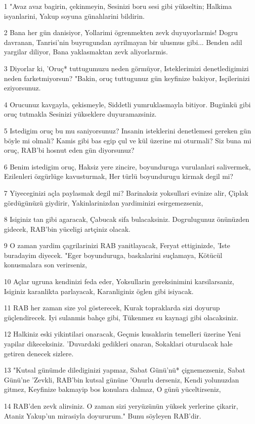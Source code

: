 \par 1 "Avaz avaz bagirin, çekinmeyin, Sesinizi boru sesi gibi yükseltin; Halkima isyanlarini, Yakup soyuna günahlarini bildirin.
\par 2 Bana her gün danisiyor, Yollarimi ögrenmekten zevk duyuyorlarmis! Dogru davranan, Tanrisi'nin buyrugundan ayrilmayan bir ulusmus gibi... Benden adil yargilar diliyor, Bana yaklasmaktan zevk aliyorlarmis.
\par 3 Diyorlar ki, 'Oruç* tuttugumuzu neden görmüyor, Isteklerimizi denetledigimizi neden farketmiyorsun? "Bakin, oruç tuttugunuz gün keyfinize bakiyor, Isçilerinizi eziyorsunuz.
\par 4 Orucunuz kavgayla, çekismeyle, Siddetli yumruklasmayla bitiyor. Bugünkü gibi oruç tutmakla Sesinizi yükseklere duyuramazsiniz.
\par 5 Istedigim oruç bu mu saniyorsunuz? Insanin isteklerini denetlemesi gereken gün böyle mi olmali? Kamis gibi bas egip çul ve kül üzerine mi oturmali? Siz buna mi oruç, RAB'bi hosnut eden gün diyorsunuz?
\par 6 Benim istedigim oruç, Haksiz yere zincire, boyunduruga vurulanlari salivermek, Ezilenleri özgürlüge kavusturmak, Her türlü boyundurugu kirmak degil mi?
\par 7 Yiyeceginizi açla paylasmak degil mi? Barinaksiz yoksullari evinize alir, Çiplak gördügünüzü giydirir, Yakinlarinizdan yardiminizi esirgemezseniz,
\par 8 Isiginiz tan gibi agaracak, Çabucak sifa bulacaksiniz. Dogrulugunuz önünüzden gidecek, RAB'bin yüceligi artçiniz olacak.
\par 9 O zaman yardim çagrilarinizi RAB yanitlayacak, Feryat ettiginizde, 'Iste buradayim diyecek. "Eger boyunduruga, baskalarini suçlamaya, Kötücül konusmalara son verirseniz,
\par 10 Açlar ugruna kendinizi feda eder, Yoksullarin gereksinimini karsilarsaniz, Isiginiz karanlikta parlayacak, Karanliginiz öglen gibi isiyacak.
\par 11 RAB her zaman size yol gösterecek, Kurak topraklarda sizi doyurup güçlendirecek. Iyi sulanmis bahçe gibi, Tükenmez su kaynagi gibi olacaksiniz.
\par 12 Halkiniz eski yikintilari onaracak, Geçmis kusaklarin temelleri üzerine Yeni yapilar dikeceksiniz. 'Duvardaki gedikleri onaran, Sokaklari oturulacak hale getiren denecek sizlere.
\par 13 "Kutsal günümde dilediginizi yapmaz, Sabat Günü'nü* çignemezseniz, Sabat Günü'ne 'Zevkli, RAB'bin kutsal gününe 'Onurlu derseniz, Kendi yolunuzdan gitmez, Keyfinize bakmayip bos konulara dalmaz, O günü yüceltirseniz,
\par 14 RAB'den zevk alirsiniz. O zaman sizi yeryüzünün yüksek yerlerine çikarir, Ataniz Yakup'un mirasiyla doyururum." Bunu söyleyen RAB'dir.

